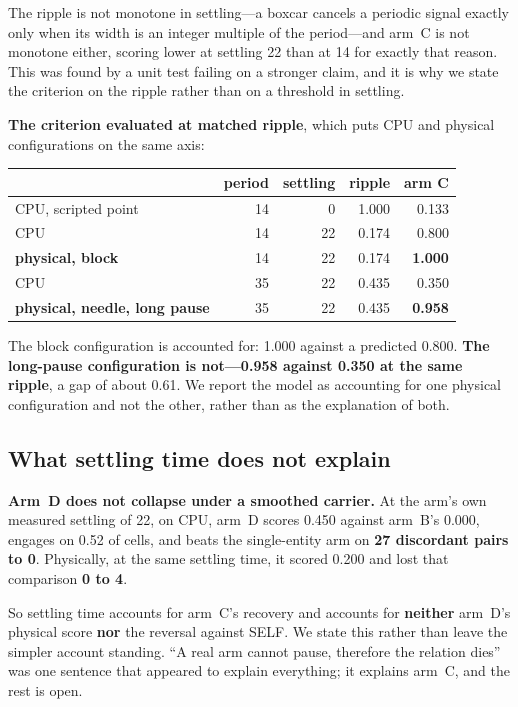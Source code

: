 \documentclass[10pt]{article}
\begin{document}
The ripple is not monotone in settling---a boxcar cancels a periodic signal
exactly only when its width is an integer multiple of the period---and arm~C is
not monotone either, scoring lower at settling 22 than at 14 for exactly that
reason. This was found by a unit test failing on a stronger claim, and it is why
we state the criterion on the ripple rather than on a threshold in settling.

\textbf{The criterion evaluated at matched ripple}, which puts CPU and physical
configurations on the same axis:

\begin{center}
\begin{tabular}{@{}lrrrr@{}}
\toprule
& period & settling & ripple & arm C \\
\midrule
CPU, scripted point & 14 & 0 & 1.000 & 0.133 \\
CPU & 14 & 22 & 0.174 & 0.800 \\
\textbf{physical, block} & 14 & 22 & 0.174 & \textbf{1.000} \\
CPU & 35 & 22 & 0.435 & 0.350 \\
\textbf{physical, needle, long pause} & 35 & 22 & 0.435 & \textbf{0.958} \\
\bottomrule
\end{tabular}
\end{center}

The block configuration is accounted for: 1.000 against a predicted 0.800.
\textbf{The long-pause configuration is not---0.958 against 0.350 at the same
ripple}, a gap of about 0.61. We report the model as accounting for one physical
configuration and not the other, rather than as the explanation of both.

\subsection{What settling time does not explain}
\label{sec:unexplained}

\textbf{Arm~D does not collapse under a smoothed carrier.} At the arm's own
measured settling of 22, on CPU, arm~D scores 0.450 against arm~B's 0.000,
engages on 0.52 of cells, and beats the single-entity arm on \textbf{27
discordant pairs to 0}. Physically, at the same settling time, it scored 0.200
and lost that comparison \textbf{0 to 4}.

So settling time accounts for arm~C's recovery and accounts for \textbf{neither}
arm~D's physical score \textbf{nor} the reversal against SELF. We state this
rather than leave the simpler account standing. ``A real arm cannot pause,
therefore the relation dies'' was one sentence that appeared to explain
everything; it explains arm~C, and the rest is open.
\end{document}
